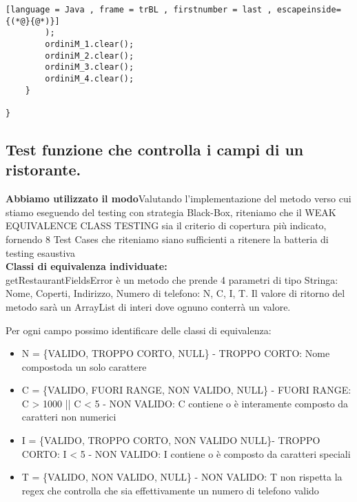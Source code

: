 \begin{lstlisting}[language = Java , frame = trBL , firstnumber = last , escapeinside={(*@}{@*)}]
        );
        ordiniM_1.clear();
        ordiniM_2.clear();
        ordiniM_3.clear();
        ordiniM_4.clear();
    }

}

\end{lstlisting}



\subsection{Test funzione che controlla i campi di un ristorante.}
\begin{flushleft}
    \textbf{Abbiamo utilizzato il modo}Valutando l'implementazione del metodo verso cui stiamo eseguendo del testing con strategia Black-Box, riteniamo che il WEAK EQUIVALENCE CLASS TESTING sia il criterio di copertura più indicato, fornendo
    8 Test Cases che riteniamo siano sufficienti a ritenere la batteria di testing esaustiva\\

    \textbf{Classi di equivalenza individuate:}\\ getRestaurantFieldsError è un metodo che prende 4 parametri di tipo Stringa: Nome, Coperti, Indirizzo, Numero di telefono: N, C, I, T.
    Il valore di ritorno del metodo sarà un ArrayList di interi dove ognuno conterrà un valore.

    Per ogni campo possimo identificare delle classi di equivalenza:
    \begin{itemize}
        \item N = \{VALIDO, TROPPO CORTO, NULL\} - TROPPO CORTO: Nome compostoda un solo carattere
        \item C = \{VALIDO, FUORI RANGE, NON VALIDO, NULL\} - FUORI RANGE: C > 1000 || C < 5 - NON VALIDO: C contiene o è interamente composto da caratteri non numerici
        \item I = \{VALIDO, TROPPO CORTO, NON VALIDO NULL\}- TROPPO CORTO: I < 5 - NON VALIDO: I contiene o è composto da caratteri speciali
        \item T = \{VALIDO, NON VALIDO, NULL\} - NON VALIDO: T non rispetta la regex che controlla che sia effettivamente un numero di telefono valido\\

    \end{itemize}
    

\end{flushleft}
\vspace{0.2cm}

